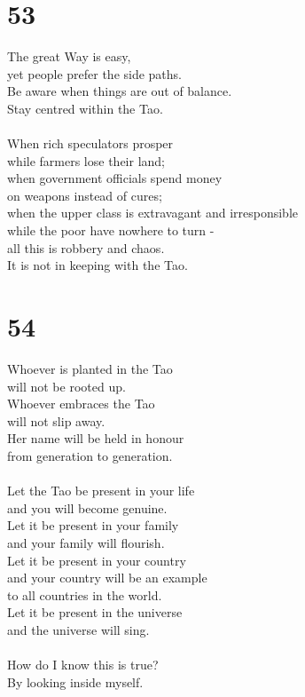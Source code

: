\documentclass[b5paper, 12pt, oneside]{book}
\begin{document}
\chapter*{53}
The great Way is easy,\\
yet people prefer the side paths.\\
Be aware when things are out of balance.\\
Stay centred within the Tao.\\
\\
When rich speculators prosper\\
while farmers lose their land;\\
when government officials spend money\\
on weapons instead of cures;\\
when the upper class is extravagant and irresponsible\\
while the poor have nowhere to turn - \\
all this is robbery and chaos.\\
It is not in keeping with the Tao.

\chapter*{54}
Whoever is planted in the Tao\\
will not be rooted up.\\
Whoever embraces the Tao\\
will not slip away.\\
Her name will be held in honour\\
from generation to generation.\\
\\
Let the Tao be present in your life\\
and you will become genuine.\\
Let it be present in your family\\
and your family will flourish.\\
Let it be present in your country\\
and your country will be an example\\
to all countries in the world.\\
Let it be present in the universe\\
and the universe will sing.\\
\\
How do I know this is true?\\
By looking inside myself.
\end{document}
